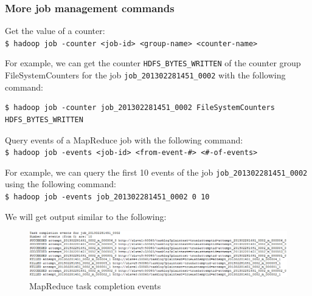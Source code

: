 \subsubsection*{More job management commands}
Get the value of a counter: \\
\verb|$ hadoop job -counter <job-id> <group-name> <counter-name>|

For example, we can get the counter \verb|HDFS_BYTES_WRITTEN| of the counter group FileSystemCounters for the job \verb|job_201302281451_0002| with the following command: 
\lstset{style=bashstyle}
\begin{lstlisting}
$ hadoop job -counter job_201302281451_0002 FileSystemCounters HDFS_BYTES_WRITTEN
\end{lstlisting}

Query events of a MapReduce job with the following command: \\
\verb|$ hadoop job -events <job-id> <from-event-#> <#-of-events>|

For example, we can query the first 10 events of the job \verb|job_201302281451_0002| using the following command: \\
\verb|$ hadoop job -events job_201302281451_0002 0 10|

We will get output similar to the following:
\begin{figure}[h]
  \centering
  \includegraphics[width=\textwidth]{figs/5163os_04_13.png}
  \caption{MapReduce task completion events}\label{fig:task.events}
\end{figure} 

